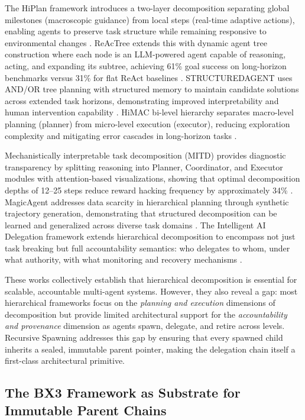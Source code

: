 The HiPlan framework introduces a two-layer decomposition separating global milestones (macroscopic guidance) from local steps (real-time adaptive actions), enabling agents to preserve task structure while remaining responsive to environmental changes \cite{mao_etal_2025_hiplan}. ReAcTree extends this with dynamic agent tree construction where each node is an LLM-powered agent capable of reasoning, acting, and expanding its subtree, achieving 61\% goal success on long-horizon benchmarks versus 31\% for flat ReAct baselines \cite{chen_etal_2025_reactree}. STRUCTUREDAGENT uses AND/OR tree planning with structured memory to maintain candidate solutions across extended task horizons, demonstrating improved interpretability and human intervention capability \cite{maeda_etal_2024_structuredagent}. HiMAC bi-level hierarchy separates macro-level planning (planner) from micro-level execution (executor), reducing exploration complexity and mitigating error cascades in long-horizon tasks \cite{lu_etal_2025_hipere}.

Mechanistically interpretable task decomposition (MITD) provides diagnostic transparency by splitting reasoning into Planner, Coordinator, and Executor modules with attention-based visualizations, showing that optimal decomposition depths of 12--25 steps reduce reward hacking frequency by approximately 34\% \cite{mitd_2025}. MagicAgent addresses data scarcity in hierarchical planning through synthetic trajectory generation, demonstrating that structured decomposition can be learned and generalized across diverse task domains \cite{wu_etal_2024_magicscript}. The Intelligent AI Delegation framework extends hierarchical decomposition to encompass not just task breaking but full accountability semantics: who delegates to whom, under what authority, with what monitoring and recovery mechanisms \cite{zhang_wei_2025_intelligent_ai_delegation}.

These works collectively establish that hierarchical decomposition is essential for scalable, accountable multi-agent systems. However, they also reveal a gap: most hierarchical frameworks focus on the \emph{planning and execution} dimensions of decomposition but provide limited architectural support for the \emph{accountability and provenance} dimension as agents spawn, delegate, and retire across levels. Recursive Spawning addresses this gap by ensuring that every spawned child inherits a sealed, immutable parent pointer, making the delegation chain itself a first-class architectural primitive.

\subsection{The BX3 Framework as Substrate for Immutable Parent Chains}
\label{sec:background_bx3}

